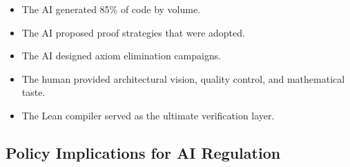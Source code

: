 \documentclass[11pt,a4paper]{article}
\begin{document}
\begin{itemize}
  \item The AI generated 85\% of code by volume.
  \item The AI proposed proof strategies that were adopted.
  \item The AI designed axiom elimination campaigns.
  \item The human provided architectural vision, quality control,
    and mathematical taste.
  \item The Lean compiler served as the ultimate verification layer.
\end{itemize}

\subsection{Policy Implications for AI Regulation}
\end{document}
